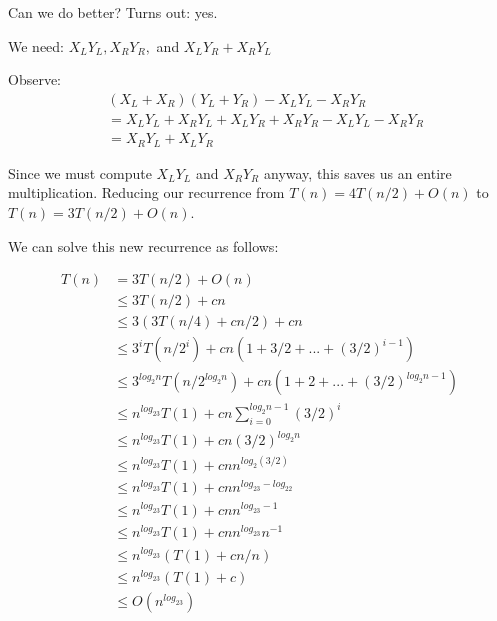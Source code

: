 Can we do better?  Turns out: yes.

We need: $X_LY_L, X_RY_R,$ and $X_LY_R + X_RY_L$

Observe: 
%
\begin{align*}
&(X_L + X_R)(Y_L + Y_R) - X_LY_L - X_RY_R \\
&= X_LY_L + X_RY_L + X_LY_R + X_RY_R - X_LY_L - X_RY_R \\
&= X_RY_L + X_LY_R
\end{align*}

Since we must compute $X_LY_L$ and $X_RY_R$ anyway, this saves us an
entire multiplication.  Reducing our recurrence from $T(n) = 4T(n/2) +
O(n)$ to $T(n) = 3T(n/2) + O(n)$.

We can solve this new recurrence as follows:

\begin{align*}
T(n)
&= 3T(n/2) + O(n) \\
&\leq 3T(n/2) + cn \\
&\leq 3(3T(n/4) + cn/2) + cn \\
&\leq 3^iT(n/2^i) + cn(1 + 3/2 + ... + (3/2)^{i-1}) \\
&\leq 3^{log_2n}T(n/2^{log_2n}) + cn(1 + 2 + ... + (3/2)^{log_2n-1}) \\
&\leq n^{log_23}T(1) + cn \sum\limits_{i=0}^{log_2n-1} (3/2)^i \\
&\leq n^{log_23}T(1) + cn (3/2)^{log_2n} \\
&\leq n^{log_23}T(1) + cn n^{log_2(3/2)} \\
&\leq n^{log_23}T(1) + cn n^{log_23 - log_22} \\
&\leq n^{log_23}T(1) + cn n^{log_23 - 1} \\
&\leq n^{log_23}T(1) + cn n^{log_23}n^{-1} \\
&\leq n^{log_23}(T(1) + cn/n) \\
&\leq n^{log_23}(T(1) + c) \\
&\leq O(n^{log_23})
\end{align*}
